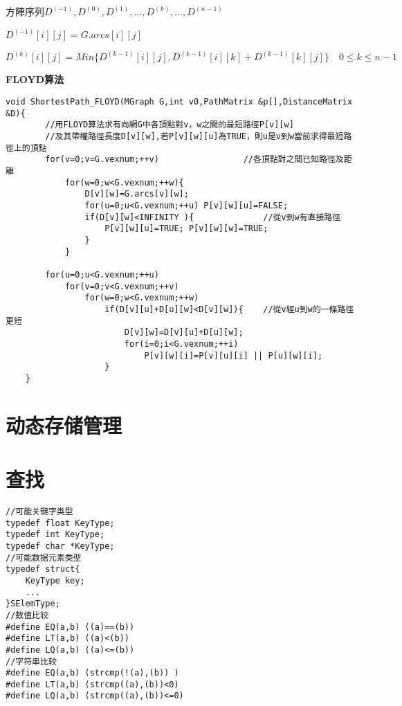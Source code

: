 \documentclass[UTF8]{ctexart}
\newcommand{\mb}[1]{\textbf{#1}}
\newcommand{\q}{\quad}
\begin{document}
方陣序列$D^{(-1)},D^{(0)},D^{(1)},\dots,D^{(k)},\dots,D^{(n-1)}$

$D^{(-1)}[i][j]=G.arcs[i][j]$

$D^{(k)}[i][j]=Min\{ D^{(k-1)}[i][j], D^{(k-1)}[i][k]+D^{(k-1)}[k][j]  \} \q 0\leqslant k\leqslant n-1$


\mb{FLOYD算法}

\begin{lstlisting}[style=v1]
    void ShortestPath_FLOYD(MGraph G,int v0,PathMatrix &p[],DistanceMatrix &D){
        //用FLOYD算法求有向網G中各頂點對v，w之間的最短路徑P[v][w]
        //及其帶權路徑長度D[v][w],若P[v][w][u]為TRUE，則u是v到w當前求得最短路徑上的頂點
        for(v=0;v=G.vexnum;++v)                 //各頂點對之間已知路徑及距離
            for(w=0;w<G.vexnum;++w){
                D[v][w]=G.arcs[v][w];
                for(u=0;u<G.vexnum;++u) P[v][w][u]=FALSE;
                if(D[v][w]<INFINITY ){              //從v到w有直接路徑
                    P[v][w][u]=TRUE; P[v][w][w]=TRUE;
                }
            }

        for(u=0;u<G.vexnum;++u)
            for(v=0;v<G.vexnum;++v)
                for(w=0;w<G.vexnum;++w)
                    if(D[v][u]+D[u][w]<D[v][w]){    //從v經u到w的一條路徑更短    
                        D[v][w]=D[v][u]+D[u][w];
                        for(i=0;i<G.vexnum;++i)
                            P[v][w][i]=P[v][u][i] || P[u][w][i];
                    }
    }
\end{lstlisting}
 


\newpage
\section{动态存储管理}



\newpage
\section{查找}
\begin{lstlisting}[style=v1]
//可能关键字类型
typedef float KeyType;
typedef int KeyType;
typedef char *KeyType;
//可能数据元素类型
typedef struct{
    KeyType key;
    ...
}SElemType;
//数值比较
#define EQ(a,b) ((a)==(b))
#define LT(a,b) ((a)<(b))
#define LQ(a,b) ((a)<=(b))
//字符串比较
#define EQ(a,b) (strcmp(!(a),(b)) )
#define LT(a,b) (strcmp((a),(b))<0)
#define LQ(a,b) (strcmp((a),(b))<=0)

\end{lstlisting}
\end{document}
